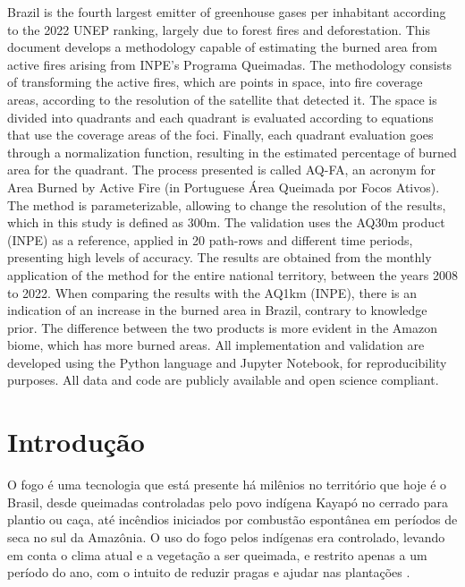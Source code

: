 \documentclass[cic,tc]{iiufrgs}
\begin{document}
\begin{translatedabstract}
Brazil is the fourth largest emitter of greenhouse gases per inhabitant according to the 2022 UNEP ranking, largely due to forest fires and deforestation. This document develops a methodology capable of estimating the burned area from active fires arising from INPE's Programa Queimadas. The methodology consists of transforming the active fires, which are points in space, into fire coverage areas, according to the resolution of the satellite that detected it. The space is divided into quadrants and each quadrant is evaluated according to equations that use the coverage areas of the foci. Finally, each quadrant evaluation goes through a normalization function, resulting in the estimated percentage of burned area for the quadrant. The process presented is called AQ-FA, an acronym for Area Burned by Active Fire (in Portuguese Área Queimada por Focos Ativos). The method is parameterizable, allowing to change the resolution of the results, which in this study is defined as 300m. The validation uses the AQ30m product (INPE) as a reference, applied in 20 path-rows and different time periods, presenting high levels of accuracy. The results are obtained from the monthly application of the method for the entire national territory, between the years 2008 to 2022. When comparing the results with the AQ1km (INPE), there is an indication of an increase in the burned area in Brazil, contrary to knowledge prior. The difference between the two products is more evident in the Amazon biome, which has more burned areas. All implementation and validation are developed using the Python language and Jupyter Notebook, for reproducibility purposes. All data and code are publicly available and open science compliant.
\end{translatedabstract}



\chapter{Introdução}


O fogo é uma tecnologia que está presente há milênios no território que hoje é o Brasil, desde queimadas controladas pelo povo indígena Kayapó no cerrado para plantio ou caça, até incêndios iniciados por combustão espontânea em períodos de seca no sul da Amazônia. O uso do fogo pelos indígenas era controlado, levando em conta o clima atual e a vegetação a ser queimada, e restrito apenas a um período do ano, com o intuito de reduzir pragas e ajudar nas plantações \citep{leonel2000}.
\end{document}
